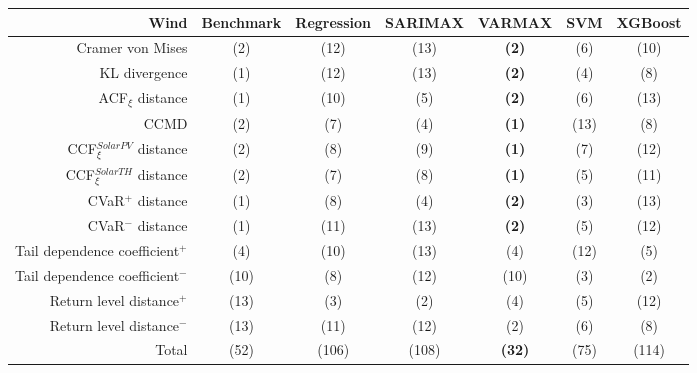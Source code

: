 \newpage
\begin{table}[ht]
    \footnotesize
    \begin{tabular}[l]{r|c|ccc|cc|}
        \toprule
        \textbf{Wind} &Benchmark&Regression&SARIMAX&VARMAX&SVM&XGBoost \\
        \midrule            
        Cramer von Mises&(2)&(12)&(13)&\textbf{(2)}&(6)&(10) \\
        KL divergence&(1)&(12)&(13)&\textbf{(2)}&(4)&(8) \\
        ACF$_\xi$ distance&(1)&(10)&(5)&\textbf{(2)}&(6)&(13) \\
        \midrule
        CCMD&(2)&(7)&(4)&\textbf{(1)}&(13)&(8) \\
        CCF$_\xi^{Solar PV}$ distance&(2)&(8)&(9)&\textbf{(1)}&(7)&(12) \\
        CCF$_\xi^{Solar TH}$ distance&(2)&(7)&(8)&\textbf{(1)}&(5)&(11) \\
        \midrule
        CVaR$^+$ distance&(1)&(8)&(4)&\textbf{(2)}&(3)&(13) \\
        CVaR$^-$ distance&(1)&(11)&(13)&\textbf{(2)}&(5)&(12) \\
        Tail dependence coefficient$^+$&(4)&(10)&(13)&(4)&(12)&(5) \\
        Tail dependence coefficient$^-$&(10)&(8)&(12)&(10)&(3)&(2) \\
        Return level distance$^+$&(13)&(3)&(2)&(4)&(5)&(12) \\
        Return level distance$^-$&(13)&(11)&(12)&(2)&(6)&(8) \\
        \bottomrule
        Total&(52)&(106)&(108)&\textbf{(32)}&(75)&(114) \\
        \bottomrule
    \end{tabular}
\end{table}
